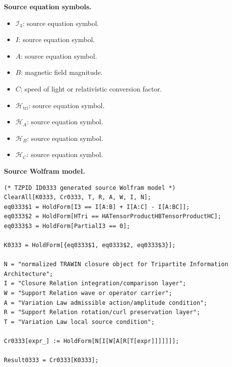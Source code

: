 \begin{minipage}[t]{0.49\linewidth}
\begingroup
\small
\raggedright
\textbf{Source equation symbols.}\par
\begin{itemize}[leftmargin=1.35em,itemsep=1pt,topsep=1pt,parsep=0pt]
    \item $\mathcal{I}_{3}$: source equation symbol.
    \item $I$: source equation symbol.
    \item $A$: source equation symbol.
    \item $B$: magnetic field magnitude.
    \item $C$: speed of light or relativistic conversion factor.
    \item $\mathcal{H}_{\mathrm{tri}}$: source equation symbol.
    \item $\mathcal{H}_{A}$: source equation symbol.
    \item $\mathcal{H}_{B}$: source equation symbol.
    \item $\mathcal{H}_{C}$: source equation symbol.
\end{itemize}
\endgroup
\end{minipage}\hfill
\begin{minipage}[t]{0.47\linewidth}
\begingroup
\scriptsize
\raggedright
\textbf{Source Wolfram model.}\par
\begin{Verbatim}[fontsize=\tiny,breaklines=true,breakanywhere=true]
(* TZPID ID0333 generated source Wolfram model *)
ClearAll[K0333, Cr0333, T, R, A, W, I, N];
eq0333$1 = HoldForm[I3 == I[A:B] + I[A:C] - I[A:BC]];
eq0333$2 = HoldForm[HTri == HATensorProductHBTensorProductHC];
eq0333$3 = HoldForm[PartialI3 == 0];

K0333 = HoldForm[{eq0333$1, eq0333$2, eq0333$3}];

N = "normalized TRAWIN closure object for Tripartite Information Architecture";
I = "Closure Relation integration/comparison layer";
W = "Support Relation wave or operator carrier";
A = "Variation Law admissible action/amplitude condition";
R = "Support Relation rotation/curl preservation layer";
T = "Variation Law local source condition";

Cr0333[expr_] := HoldForm[N[I[W[A[R[T[expr]]]]]]];

Result0333 = Cr0333[K0333];
\end{Verbatim}
\endgroup
\end{minipage}

